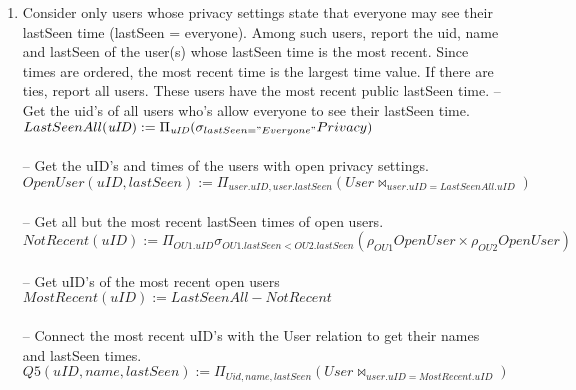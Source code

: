 \documentclass{article}
\newcommand{\var}[1]{\mathit{#1}}
\begin{document}
\begin{enumerate}
\item   %
Consider only users whose privacy settings state that everyone may see their lastSeen time (lastSeen = everyone). Among such users, report the uid, name and lastSeen of the user(s) whose lastSeen time is the most recent. Since times are ordered, the most recent time is the largest time value. If there are ties, report all users. These users have the most recent public lastSeen time.
{\large
\hspace*{1cm} -- Get the uid's of all users who's allow everyone to see their lastSeen time. \\ [5pt]
$
LastSeenAll(\var{uID}) :=
	\Pi_{\var{\var{uID}}}
	(\sigma_{lastSeen = "Everyone"} Privacy)
$ \\\\
\hspace*{1cm} -- Get the uID's and times of the users with open privacy settings. \\ [5pt]
$
OpenUser(uID, lastSeen) := 
	\Pi_{user.uID, user.lastSeen}
	(User \bowtie_{user.uID = LastSeenAll.uID})
$\\\\
\hspace*{1cm} -- Get all but the most recent lastSeen times of open users. \\ [5pt]
$
NotRecent(\var{uID}) := \Pi_{\var{OU1.uID}}
	\sigma_{OU1.\var{lastSeen} < OU2.\var{lastSeen}}
	(\rho_{OU1}OpenUser \times \rho_{OU2}OpenUser)
$\\\\
\hspace*{1cm} -- Get uID's of the most recent open users
$
MostRecent(\var{uID}) := LastSeenAll - NotRecent
$\\\\
\hspace*{1cm} -- Connect the most recent uID's with the User relation to get their names and lastSeen times. \\ [5pt]
$
Q5(\var{uID}, \var{name}, \var{lastSeen}) := 
	\Pi_{\var{Uid}, \var{name}, \var{lastSeen}} 
	(User \bowtie_{user.\var{uID} = MostRecent.\var{uID}})
$\\\\
}


\end{enumerate}
\end{document}

